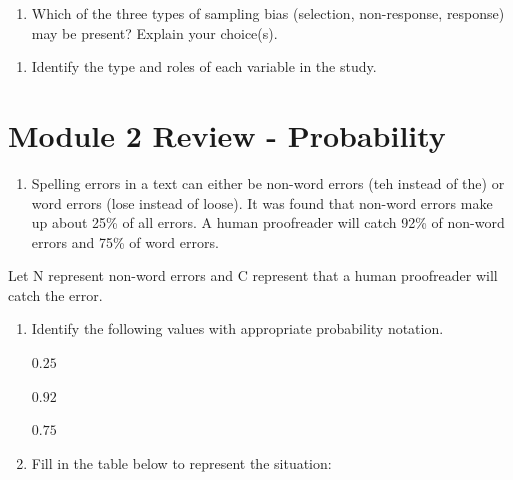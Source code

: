 \documentclass[
]{report}
\providecommand{\tightlist}{%
  \setlength{\itemsep}{0pt}\setlength{\parskip}{0pt}}
\begin{document}
\vspace{0.4in}

\begin{enumerate}
\def\labelenumi{\alph{enumi}.}
\setcounter{enumi}{2}
\tightlist
\item
  Which of the three types of sampling bias (selection, non-response, response) may be present? Explain your choice(s).
\end{enumerate}

\vspace{0.4in}

\begin{enumerate}
\def\labelenumi{\alph{enumi}.}
\setcounter{enumi}{3}
\tightlist
\item
  Identify the type and roles of each variable in the study.
\end{enumerate}

\vspace{0.6in}

\newpage

\section{Module 2 Review - Probability}\label{module-2-review---probability}

\begin{enumerate}
\def\labelenumi{\arabic{enumi}.}
\tightlist
\item
  Spelling errors in a text can either be non-word errors (teh instead of the) or word errors (lose instead of loose). It was found that non-word errors make up about 25\% of all errors. A human proofreader will catch 92\% of non-word errors and 75\% of word errors.
\end{enumerate}

Let N represent non-word errors and C represent that a human proofreader will catch the error.

\begin{enumerate}
\def\labelenumi{\alph{enumi}.}
\item
  Identify the following values with appropriate probability notation.
  \vspace{2mm}

  \(0.25\)
  \vspace{2mm}

  \(0.92\)
  \vspace{2mm}

  \(0.75\)
  \vspace{2mm}
\item
  Fill in the table below to represent the situation:
\end{enumerate}
\end{document}
